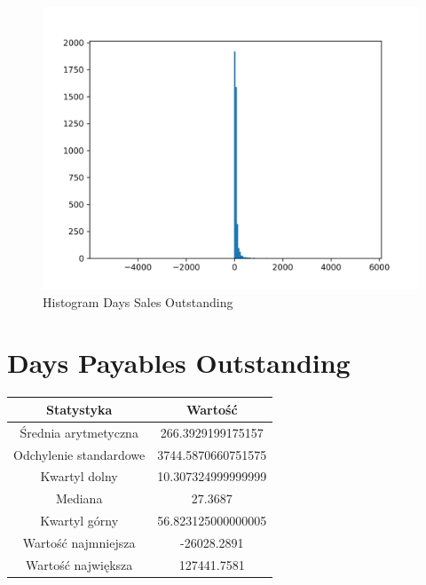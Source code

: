\documentclass{article}
\begin{document}
\begin{figure}[h!]
    \includegraphics[width=\linewidth]{variables/Days Sales Outstanding.png}
    \caption{Histogram Days Sales Outstanding }
\end{figure}\section{ Days Payables Outstanding }

\begin{center}
    \begin{tabular}{|c | c|} 
    \hline
    Statystyka & Wartość \\
    \hline\hline
    Średnia arytmetyczna & 266.3929199175157 \\ 
    \hline
    Odchylenie standardowe & 3744.5870660751575 \\
    \hline
    Kwartyl dolny & 10.307324999999999 \\
    \hline
    Mediana & 27.3687 \\
    \hline
    Kwartyl górny & 56.823125000000005 \\
    \hline
    Wartość najmniejsza & -26028.2891 \\
    \hline
    Wartość największa & 127441.7581 \\
    \hline
   \end{tabular}
\end{center}
\end{document}

